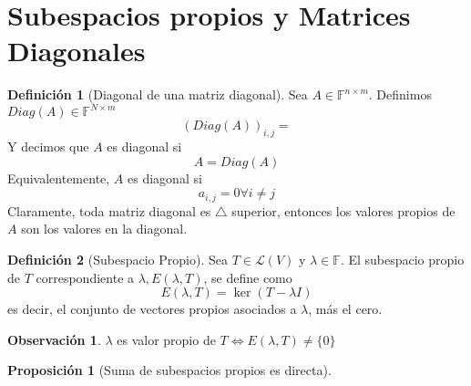\documentclass[11pt]{book}
\newcommand{\set}[1]{\mathbb{#1}}
\newtheorem{prop}[thm]{Proposición}
\theoremstyle{definition}
\newtheorem{defn}{Definición}[section]
\newtheorem{obs}{Observación}[section]
\begin{document}
\section{Subespacios propios y Matrices Diagonales}
\begin{defn}[Diagonal de una matriz diagonal]
	Sea $A\in\set{F}^{n\times m}$. Definimos $Diag(A)\in\set{F}^{N\times m}$
	\[(Diag(A))_{i,j}=\]
	Y decimos que $A$ es diagonal si
	\[A=Diag(A)\]
	Equivalentemente, $A$ es diagonal si 
	\[a_{i,j}=0\forall i\neq j\]
	Claramente, toda matriz diagonal es $\triangle$ superior, entonces los valores propios de $A$ son los valores en la diagonal.	
\end{defn}
\begin{defn}[Subespacio Propio]
	Sea $T\in\mathcal{L}(V)$ y $\lambda\in\set{F}$. El subespacio propio de $T$ correspondiente a $\lambda, E(\lambda,T)$, se define como
	\[E(\lambda,T)=\ker (T-\lambda I)\]
	es decir, el conjunto de vectores propios asociados a $\lambda$, más el cero.
	\begin{obs}
		$\lambda$ es valor propio de $T\iff E(\lambda, T)\neq \{0\}$
	\end{obs}
\end{defn}
\begin{prop}[Suma de subespacios propios es directa]
	
\end{prop}
\end{document}
